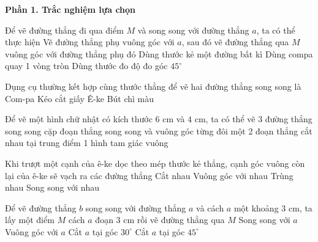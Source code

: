 \textbf{Phần 1. Trắc nghiệm lựa chọn}

\begin{ex} %
Để vẽ đường thẳng đi qua điểm $M$ và song song với đường thẳng $a$, ta có thể thực hiện
\choice
{\True Vẽ đường thẳng phụ vuông góc với $a$, sau đó vẽ đường thẳng qua $M$ vuông góc với đường thẳng phụ đó}
{Dùng thước kẻ một đường bất kì}
{Dùng compa quay 1 vòng tròn}
{Dùng thước đo độ đo góc $45^\circ$}
\end{ex}

\begin{ex} %
Dụng cụ thường kết hợp cùng thước thẳng để vẽ hai đường thẳng song song là
\choice
{Com-pa}
{Kéo cắt giấy}
{\True Ê-ke}
{Bút chì màu}
\end{ex}

\begin{ex} %
Để vẽ một hình chữ nhật có kích thước $6\text{ cm}$ và $4\text{ cm}$, ta có thể vẽ
\choice
{3 đường thẳng song song}
{ cặp đoạn thẳng song song và vuông góc từng đôi một}
{2 đoạn thẳng cắt nhau tại trung điểm}
{1 hình tam giác vuông}
\end{ex}

\begin{ex} %
Khi trượt một cạnh của ê-ke dọc theo mép thước kẻ thẳng, cạnh góc vuông còn lại của ê-ke sẽ vạch ra các đường thẳng
\choice
{Cắt nhau}
{Vuông góc với nhau}
{Trùng nhau}
{\True Song song với nhau}
\end{ex}

\begin{ex} %
Để vẽ đường thẳng $b$ song song với đường thẳng $a$ và cách $a$ một khoảng $3\text{ cm}$, ta lấy một điểm $M$ cách $a$ đoạn $3\text{ cm}$ rồi vẽ đường thẳng qua $M$
\choice
{\True Song song với $a$}
{Vuông góc với $a$}
{Cắt $a$ tại góc $30^\circ$}
{Cắt $a$ tại góc $45^\circ$}
\end{ex}

